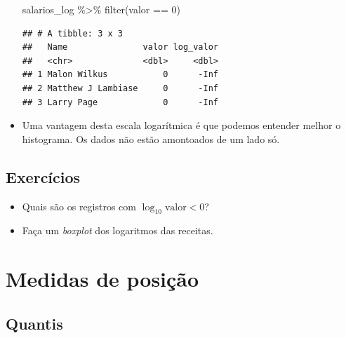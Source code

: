 \documentclass[
  11pt]{report}
\newenvironment{Shaded}{\begin{snugshade}}{\end{snugshade}}
\newcommand{\DecValTok}[1]{\textcolor[rgb]{0.00,0.00,0.81}{#1}}
\newcommand{\FunctionTok}[1]{\textcolor[rgb]{0.00,0.00,0.00}{#1}}
\newcommand{\NormalTok}[1]{#1}
\newcommand{\SpecialCharTok}[1]{\textcolor[rgb]{0.00,0.00,0.00}{#1}}
\renewenvironment{Shaded}{
    \begin{mdframed}[%
      roundcorner=2pt,%
      innerleftmargin=5pt,%
      innerrightmargin=5pt,%
      topline=true,%
      leftline=true,%
      rightline=true,%
      bottomline=true,%
      linewidth=0.5pt,%
      linecolor=black!20,%
      backgroundcolor=black!2,%
      skipabove=2ex,%
      skipbelow=2.5ex%
    ]%
  }
  {
    \end{mdframed}
  }
\begin{document}
\begin{itemize}
\begin{Shaded}
\begin{Highlighting}[]
\NormalTok{salarios\_log }\SpecialCharTok{\%\textgreater{}\%} 
  \FunctionTok{filter}\NormalTok{(valor }\SpecialCharTok{==} \DecValTok{0}\NormalTok{)}
\end{Highlighting}
\end{Shaded}

\begin{verbatim}
## # A tibble: 3 x 3
##   Name               valor log_valor
##   <chr>              <dbl>     <dbl>
## 1 Malon Wilkus           0      -Inf
## 2 Matthew J Lambiase     0      -Inf
## 3 Larry Page             0      -Inf
\end{verbatim}
\item
  Uma vantagem desta escala logarítmica é que podemos entender melhor o histograma. Os dados não estão amontoados de um lado só.
\end{itemize}

\hypertarget{exercuxedcios-9}{%
\subsection{Exercícios}\label{exercuxedcios-9}}

\begin{itemize}
\item
  Quais são os registros com $\log_{10} \text{valor} < 0$?
\item
  Faça um \emph{boxplot} dos logaritmos das receitas.
\end{itemize}

\hypertarget{medidas-de-posiuxe7uxe3o}{%
\section{Medidas de posição}\label{medidas-de-posiuxe7uxe3o}}

\hypertarget{quantis}{%
\subsection{Quantis}\label{quantis}}
\end{document}
